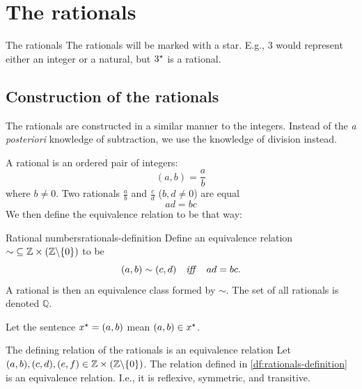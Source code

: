 \chapter{The rationals}

\begin{notation}{The rationals}{}
  The rationals will be marked with a star. E.g., \(3\) would represent either an
  integer or a natural, but \(3^{\star}\) is a rational.
\end{notation}

\section{Construction of the rationals}

The rationals are constructed in a similar manner to the integers. Instead of the
\emph{a posteriori} knowledge of subtraction, we use the knowledge of division instead.

A rational is an ordered pair of integers:
\begin{equation}
  (a, b) = \frac{a}{b}
\end{equation}
where \(b \neq 0\). Two rationals \(\frac{a}{b}\) and \(\frac{c}{d}\) (\(b, d \neq 0\))
are equal \ifft
\begin{equation}
  ad = bc
\end{equation}
We then define the equivalence relation to be that way:

\begin{df}{Rational numbers}{rationals-definition}
  Define an equivalence relation
  \(\mathord{\sim} \subseteq \mathbb{Z} \times (\mathbb{Z} \backslash \{0\})\) to be
  \begin{equation}
    (a, b) \sim (c, d) \quad\textrm{\emph{iff}}\quad ad = bc.
  \end{equation}
  A rational is then an equivalence class formed by \(\sim\). The set of all rationals
  is denoted \(\mathbb{Q}\).

  Let the sentence \(x^{\star} = (a, b)\) mean \((a, b) \in x^{\star}\).
\end{df}

\begin{prop}{The defining relation of the rationals is an equivalence relation}{}
  Let \((a, b), (c, d), (e, f) \in \mathbb{Z} \times (\mathbb{Z} \backslash \{0\})\). The
  relation defined in \cref{df:rationals-definition} is an equivalence relation. I.e.,
  it is reflexive, symmetric, and transitive.
\end{prop}

